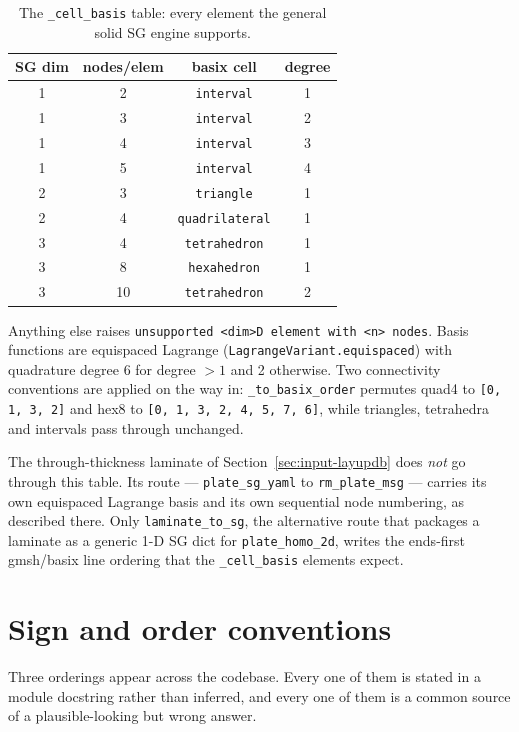 \begin{table}[htbp]
\centering
\small
\caption{The \texttt{\_cell\_basis} table: every element the general solid SG
engine supports.}
\label{tab:input-cellbasis}
\begin{tabular}{@{}cccc@{}}
\toprule
SG dim & nodes/elem & basix cell & degree \\
\midrule
1 & 2 & \texttt{interval} & 1 \\
1 & 3 & \texttt{interval} & 2 \\
1 & 4 & \texttt{interval} & 3 \\
1 & 5 & \texttt{interval} & 4 \\
2 & 3 & \texttt{triangle} & 1 \\
2 & 4 & \texttt{quadrilateral} & 1 \\
3 & 4 & \texttt{tetrahedron} & 1 \\
3 & 8 & \texttt{hexahedron} & 1 \\
3 & 10 & \texttt{tetrahedron} & 2 \\
\bottomrule
\end{tabular}
\end{table}

Anything else raises \texttt{unsupported <dim>D element with <n> nodes}. Basis
functions are equispaced Lagrange (\texttt{LagrangeVariant.equispaced}) with
quadrature degree 6 for degree $>1$ and 2 otherwise. Two connectivity
conventions are applied on the way in: \texttt{\_to\_basix\_order} permutes quad4
to \texttt{[0, 1, 3, 2]} and hex8 to \texttt{[0, 1, 3, 2, 4, 5, 7, 6]}, while
triangles, tetrahedra and intervals pass through unchanged.

The through-thickness laminate of Section~\ref{sec:input-layupdb} does
\emph{not} go through this table. Its route ---
\texttt{plate\_sg\_yaml} to \texttt{rm\_plate\_msg} --- carries its own
equispaced Lagrange basis and its own sequential node numbering, as described
there. Only \texttt{laminate\_to\_sg}, the alternative route that packages a
laminate as a generic 1-D SG dict for \texttt{plate\_homo\_2d}, writes the
ends-first gmsh/basix line ordering that the \texttt{\_cell\_basis} elements
expect.

\section{Sign and order conventions}
\label{sec:input-conventions}

Three orderings appear across the codebase. Every one of them is stated in a
module docstring rather than inferred, and every one of them is a common source
of a plausible-looking but wrong answer.

